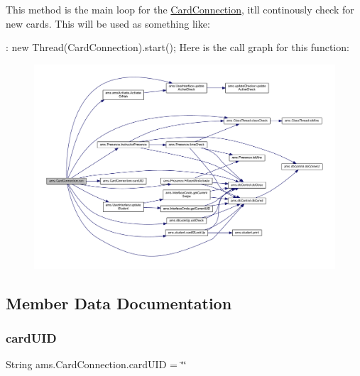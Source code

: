 This method is the main loop for the \mbox{\hyperlink{classams_1_1_card_connection}{Card\+Connection}}, it\textquotesingle{}ll continously check for new cards. This will be used as something like\+: 
\begin{DoxyCode}{0}
\end{DoxyCode}
 \+: new Thread(\+Card\+Connection).start(); Here is the call graph for this function\+:\nopagebreak
\begin{figure}[H]
\begin{center}
\leavevmode
\includegraphics[width=350pt]{classams_1_1_card_connection_a051dbf503815b5296b95ead953c5a137_cgraph}
\end{center}
\end{figure}


\subsection{Member Data Documentation}
\mbox{\label{classams_1_1_card_connection_a50141d033d85f1e5859c09b4cdcf6d9f}} 
\subsubsection{\texorpdfstring{cardUID}{cardUID}}
{\footnotesize\ttfamily String ams.\+Card\+Connection.\+card\+U\+ID = \char`\"{}\char`\"{}\hspace{0.3cm}{\ttfamily [static]}}

\mbox{\label{classams_1_1_card_connection_a4e2e084c8d7f8b0c4008f1f4b3723c5a}} 
